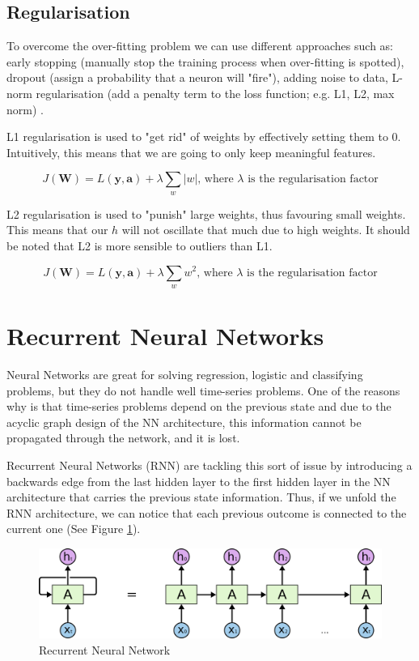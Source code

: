 \subsection{Regularisation}
To overcome the over-fitting problem we can use different approaches such as: early stopping (manually stop the training process when over-fitting is spotted), dropout (assign a probability that a neuron will "fire"), adding noise to data, L-norm regularisation (add a penalty term to the loss function; e.g. L1, L2, max norm) \cite{ml, russell2016artificial, Goodfellow-et-al-2016}.

L1 regularisation is used to "get rid" of weights by effectively setting them to 0. Intuitively, this means that we are going to only keep meaningful features.

$$J(\boldsymbol{W}) = L(\boldsymbol{y}, \boldsymbol{a}) + \lambda \sum_{w} |w|\textrm{, where $\lambda$ is the regularisation factor}$$

L2 regularisation is used to "punish" large weights, thus favouring small weights. This means that our $h$ will not oscillate that much due to high weights. It should be noted that L2 is more sensible to outliers than L1.

$$J(\boldsymbol{W}) = L(\boldsymbol{y}, \boldsymbol{a}) + \lambda \sum_{w} w^2\textrm{, where $\lambda$ is the regularisation factor}$$

\section{Recurrent Neural Networks}
Neural Networks are great for solving regression, logistic and classifying problems, but they do not handle well time-series problems. One of the reasons why is that time-series problems depend on the previous state and due to the acyclic graph design of the NN architecture, this information cannot be propagated through the network, and it is lost.

Recurrent Neural Networks (RNN) \cite{ml, LSTM_blog} are tackling this sort of issue by introducing a backwards edge from the last hidden layer to the first hidden layer in the NN architecture that carries the previous state information. Thus, if we unfold the RNN architecture, we can notice that each previous outcome is connected to the current one (See Figure \ref{fig:RNN}).

\begin{figure}[h]
  \centering
  \includegraphics[scale=0.30]{images/RNN-unrolled.png}
  \caption{Recurrent Neural Network \cite{LSTM_blog}}
  \label{fig:RNN}
\end{figure}

